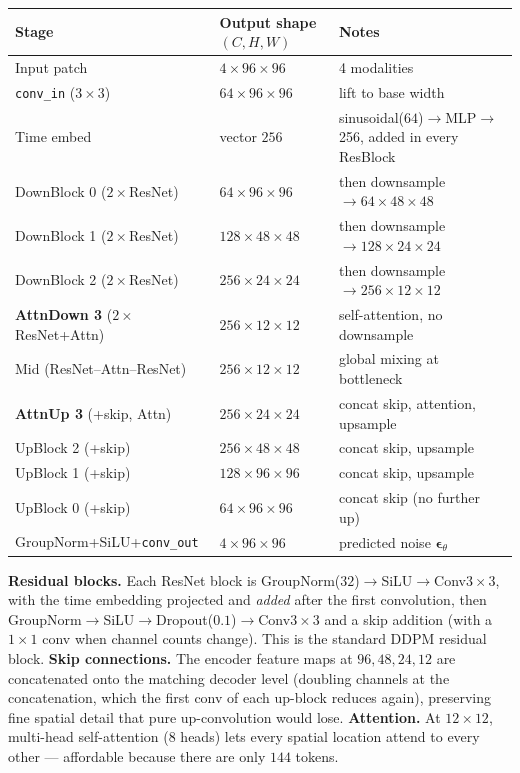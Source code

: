 \documentclass[11pt,a4paper]{article}
\newcommand{\eps}{\bm{\epsilon}}
\newcommand{\code}[1]{\texttt{\small #1}}
\begin{document}
\begin{longtable}{@{}lll@{}}
\toprule
Stage & Output shape $(C,H,W)$ & Notes \\
\midrule
\endhead
Input patch                 & $4\times96\times96$   & 4 modalities \\
\code{conv\_in} ($3{\times}3$) & $64\times96\times96$ & lift to base width \\
Time embed                  & vector $256$          & sinusoidal($64$)$\to$MLP$\to$256, added in every ResBlock \\
DownBlock 0 ($2\times$ResNet)& $64\times96\times96$ & then downsample $\to 64\times48\times48$ \\
DownBlock 1 ($2\times$ResNet)& $128\times48\times48$& then downsample $\to 128\times24\times24$ \\
DownBlock 2 ($2\times$ResNet)& $256\times24\times24$& then downsample $\to 256\times12\times12$ \\
\textbf{AttnDown 3} ($2\times$ResNet+Attn)& $256\times12\times12$ & self-attention, no downsample \\
Mid (ResNet–Attn–ResNet)    & $256\times12\times12$ & global mixing at bottleneck \\
\textbf{AttnUp 3} (+skip, Attn)& $256\times24\times24$ & concat skip, attention, upsample \\
UpBlock 2 (+skip)           & $256\times48\times48$ & concat skip, upsample \\
UpBlock 1 (+skip)           & $128\times96\times96$ & concat skip, upsample \\
UpBlock 0 (+skip)           & $64\times96\times96$  & concat skip (no further up) \\
GroupNorm+SiLU+\code{conv\_out}& $4\times96\times96$ & predicted noise $\eps_\theta$ \\
\bottomrule
\end{longtable}

\textbf{Residual blocks.} Each ResNet block is
GroupNorm($32$)$\to$SiLU$\to$Conv$3{\times}3$, with the time embedding projected
and \emph{added} after the first convolution, then
GroupNorm$\to$SiLU$\to$Dropout($0.1$)$\to$Conv$3{\times}3$ and a skip addition
(with a $1{\times}1$ conv when channel counts change). This is the standard DDPM
residual block.
\textbf{Skip connections.} The encoder feature maps at $96,48,24,12$ are
concatenated onto the matching decoder level (doubling channels at the
concatenation, which the first conv of each up-block reduces again), preserving
fine spatial detail that pure up-convolution would lose.
\textbf{Attention.} At $12\times12$, multi-head self-attention ($8$ heads) lets
every spatial location attend to every other --- affordable because there are
only $144$ tokens.
\end{document}
